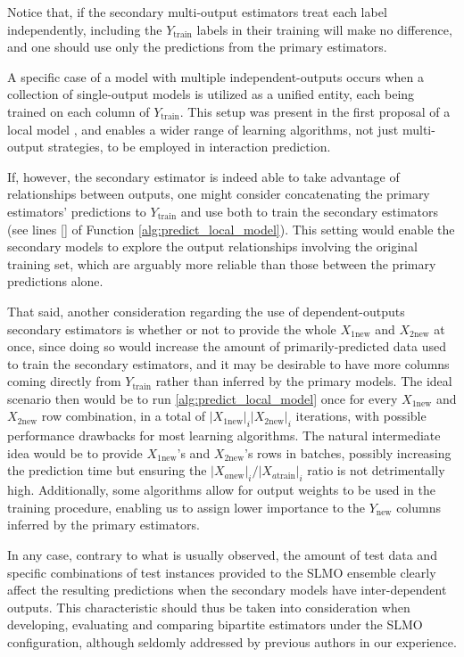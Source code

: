 Notice that, if the secondary multi-output estimators treat each label independently, including the $Y_\text{train}$ labels in their training will make no difference, and one should use only the predictions from the primary estimators.

A specific case of a model with multiple independent-outputs occurs when a collection of single-output models is utilized as a unified entity, each being trained on each column of $Y_\text{train}$. This setup was present in the first proposal of a local model \cite{}, and enables a wider range of learning algorithms, not just multi-output strategies, to be employed in interaction prediction.

If, however, the secondary estimator is indeed able to take advantage of relationships between outputs, one might consider concatenating the primary estimators' predictions to $Y_\text{train}$ and use both to train the secondary estimators (see lines \ref{} of Function \ref{alg:predict_local_model}). This setting would enable the secondary models to explore the output relationships involving the original training set, which are arguably more reliable than those between the primary predictions alone.

That said, another consideration regarding the use of dependent-outputs secondary estimators is whether or not to provide the whole $X_{1\text{new}}$ and $X_{2\text{new}}$ at once, since doing so would increase the amount of primarily-predicted data used to train the secondary estimators, and it may be desirable to have more columns coming directly from $Y_\text{train}$ rather than inferred by the primary models. The ideal scenario then would be to run \ref{alg:predict_local_model} once for every $X_{1\text{new}}$ and $X_{2\text{new}}$ row combination, in a total of $|X_{1\text{new}}|_i|X_{2\text{new}}|_i$ iterations, with possible performance drawbacks for most learning algorithms. The natural intermediate idea would be to provide $X_{1\text{new}}$'s and $X_{2\text{new}}$'s rows in batches, possibly increasing the prediction time but ensuring the $|X_{a\text{new}}|_i/|X_{a\text{train}}|_i$ ratio is not detrimentally high. Additionally, some algorithms allow for output weights to be used in the training procedure, enabling us to assign lower importance to the $Y_{\text{new}}$ columns inferred by the primary estimators.

In any case, contrary to what is usually observed, the amount of test data and specific combinations of test instances provided to the SLMO ensemble clearly affect the resulting predictions when the secondary models have inter-dependent outputs. This characteristic should thus be taken into consideration when developing, evaluating and comparing bipartite estimators under the SLMO configuration, although seldomly addressed by previous authors in our experience.%

